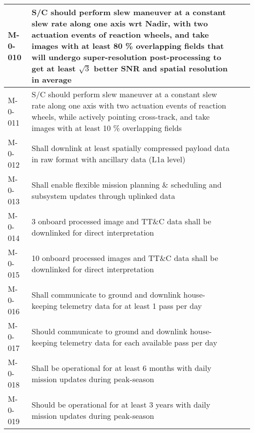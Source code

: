 \begin{table*}[htbp]
\begin{tabular}{l p{12cm} c c}
			\hline
			M-0-010 & S/C should perform slew maneuver at a constant slew rate along one axis wrt Nadir, with two actuation events of reaction wheels, and take images with at least 80 \% overlapping fields that will undergo super-resolution post-processing to get at least $\sqrt{3}$ better SNR and spatial resolution in average & & \checkmark \\
			\hline
			M-0-011 & S/C should perform slew maneuver at a constant slew rate along one axis with two actuation events of reaction wheels, while actively pointing cross-track, and take images with at least 10 \% overlapping fields & & \checkmark \\
			\hline
			M-0-012 & Shall downlink at least spatially compressed payload data in raw format with ancillary data (L1a level) & \checkmark & \\
			\hline
			M-0-013 & Shall enable flexible mission planning \& scheduling and subsystem updates through uplinked data & \checkmark & \\
			\hline
			M-0-014 & 3 onboard processed image and TT\&C data shall be downlinked for direct interpretation & \checkmark & \\
			\hline
			M-0-015 & 10 onboard processed images and TT\&C data shall be downlinked for direct interpretation & & \checkmark \\
			\hline
			M-0-016 & Shall communicate to ground and downlink house-keeping telemetry data for at least 1 pass per day & \checkmark &  \\
			\hline
			M-0-017 & Should communicate to ground and downlink house-keeping telemetry data for each available pass per day &  & \checkmark \\
			\hline
			M-0-018 & Shall be operational for at least 6 months with daily mission updates during peak-season & \checkmark & \\
			\hline
			M-0-019 & Should be operational for at least 3 years with daily mission updates during peak-season &  & \checkmark \\
			\hline
		\end{tabular}
\end{table*} 

